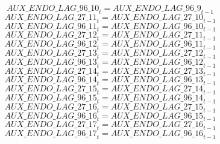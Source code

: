 \begin{dmath}
{AUX\_ENDO\_LAG\_96\_10}_{t}={AUX\_ENDO\_LAG\_96\_9}_{t-1}
\end{dmath}
\begin{dmath}
{AUX\_ENDO\_LAG\_27\_11}_{t}={AUX\_ENDO\_LAG\_27\_10}_{t-1}
\end{dmath}
\begin{dmath}
{AUX\_ENDO\_LAG\_96\_11}_{t}={AUX\_ENDO\_LAG\_96\_10}_{t-1}
\end{dmath}
\begin{dmath}
{AUX\_ENDO\_LAG\_27\_12}_{t}={AUX\_ENDO\_LAG\_27\_11}_{t-1}
\end{dmath}
\begin{dmath}
{AUX\_ENDO\_LAG\_96\_12}_{t}={AUX\_ENDO\_LAG\_96\_11}_{t-1}
\end{dmath}
\begin{dmath}
{AUX\_ENDO\_LAG\_27\_13}_{t}={AUX\_ENDO\_LAG\_27\_12}_{t-1}
\end{dmath}
\begin{dmath}
{AUX\_ENDO\_LAG\_96\_13}_{t}={AUX\_ENDO\_LAG\_96\_12}_{t-1}
\end{dmath}
\begin{dmath}
{AUX\_ENDO\_LAG\_27\_14}_{t}={AUX\_ENDO\_LAG\_27\_13}_{t-1}
\end{dmath}
\begin{dmath}
{AUX\_ENDO\_LAG\_96\_14}_{t}={AUX\_ENDO\_LAG\_96\_13}_{t-1}
\end{dmath}
\begin{dmath}
{AUX\_ENDO\_LAG\_27\_15}_{t}={AUX\_ENDO\_LAG\_27\_14}_{t-1}
\end{dmath}
\begin{dmath}
{AUX\_ENDO\_LAG\_96\_15}_{t}={AUX\_ENDO\_LAG\_96\_14}_{t-1}
\end{dmath}
\begin{dmath}
{AUX\_ENDO\_LAG\_27\_16}_{t}={AUX\_ENDO\_LAG\_27\_15}_{t-1}
\end{dmath}
\begin{dmath}
{AUX\_ENDO\_LAG\_96\_16}_{t}={AUX\_ENDO\_LAG\_96\_15}_{t-1}
\end{dmath}
\begin{dmath}
{AUX\_ENDO\_LAG\_27\_17}_{t}={AUX\_ENDO\_LAG\_27\_16}_{t-1}
\end{dmath}
\begin{dmath}
{AUX\_ENDO\_LAG\_96\_17}_{t}={AUX\_ENDO\_LAG\_96\_16}_{t-1}
\end{dmath}
